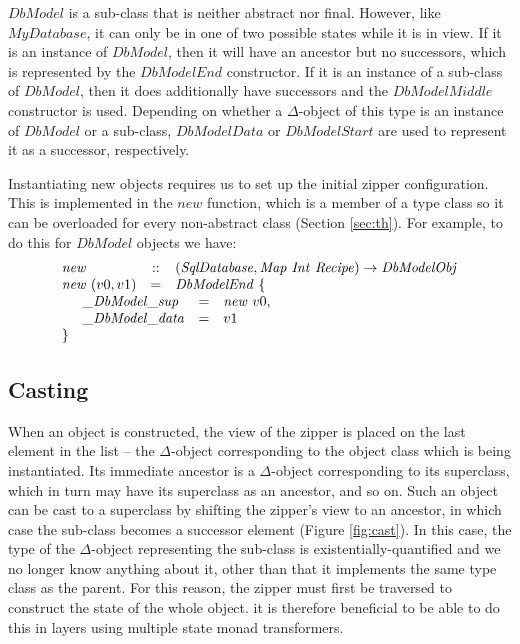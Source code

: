 $\mathit{DbModel}$ is a sub-class that is neither abstract nor final. However, like $\mathit{MyDatabase}$, it can only be in one of two possible states while it is in view. If it is an instance of $\mathit{DbModel}$, then it will have an ancestor but no successors, which is represented by the $\mathit{DbModelEnd}$ constructor. If it is an instance of a sub-class of $\mathit{DbModel}$, then it does additionally have successors and the $\mathit{DbModelMiddle}$ constructor is used. Depending on whether a $\Delta$-object of this type is an instance of $\mathit{DbModel}$ or a sub-class, $\mathit{DbModelData}$ or $\mathit{DbModelStart}$ are used to represent it as a successor, respectively.

Instantiating new objects requires us to set up the initial zipper configuration. This is implemented in the $\mathit{new}$ function, which is a member of a type class so it can be overloaded for every non-abstract class (Section \ref{sec:th}). For example, to do this for $\mathit{DbModel}$ objects we have:
\begin{displaymath}
\begin{array}{lcl}
\mathit{new} & :: & (\mathit{SqlDatabase}, \mathit{Map}~\mathit{Int}~\mathit{Recipe}) \to 
\mathit{DbModelObj} \\
\mathit{new}~(v0,v1) & = & \mathit{DbModelEnd}~\{ \\
\multicolumn{3}{l}{\quad \begin{array}{lcl}
    \_\mathit{DbModel}\_\mathit{sup} & = & \mathit{new}~v0, \\
    \_\mathit{DbModel}\_\mathit{data} & = & v1
    \end{array}} \\
    \}&&
\end{array}
\end{displaymath}

\subsection{Casting}

When an object is constructed, the view of the zipper is placed on the last element in the list -- the $\Delta$-object corresponding to the object class which is being instantiated. Its immediate ancestor is a $\Delta$-object corresponding to its superclass, which in turn may have its superclass as an ancestor, and so on. Such an object can be cast to a superclass by shifting the zipper's view to an ancestor, in which case the sub-class becomes a successor element (Figure \ref{fig:cast}). In this case, the type of the $\Delta$-object representing the sub-class is existentially-quantified and we no longer know anything about it, other than that it implements the same type class as the parent. For this reason, the zipper must first be traversed to construct the state of the whole object. it is therefore beneficial to be able to do this in layers using multiple state monad transformers.

